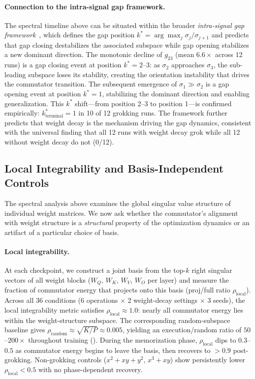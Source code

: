 \documentclass[11pt]{article}
\begin{document}
\paragraph{Connection to the intra-signal gap framework.}
The spectral timeline above can be situated within the broader \emph{intra-signal gap framework}~\citep{xu2026spectral_edge}, which defines the gap position $k^* = \arg\max_j \sigma_j/\sigma_{j+1}$ and predicts that gap closing destabilizes the associated subspace while gap opening stabilizes a new dominant direction.
The monotonic decline of $g_{23}$ (mean $6.6\times$ across 12 runs) is a gap closing event at position $k^* = 2$--$3$: as $\sigma_2$ approaches $\sigma_3$, the sub-leading subspace loses its stability, creating the orientation instability that drives the commutator transition.
The subsequent emergence of $\sigma_1 \gg \sigma_2$ is a gap opening event at position $k^* = 1$, stabilizing the dominant direction and enabling generalization.
This $k^*$ shift---from position 2--3 to position 1---is confirmed empirically: $k^*_{\mathrm{terminal}} = 1$ in 10 of 12 grokking runs.
The framework further predicts that weight decay is the mechanism driving the gap dynamics, consistent with the universal finding that all 12 runs with weight decay grok while all 12 without weight decay do not (0/12).

\subsection{Local Integrability and Basis-Independent Controls}
\label{sec:local_integrability}

The spectral analysis above examines the global singular value structure of individual weight matrices.
We now ask whether the commutator's alignment with weight structure is a \emph{structural} property of the optimization dynamics or an artifact of a particular choice of basis.

\paragraph{Local integrability.}
At each checkpoint, we construct a joint basis from the top-$k$ right singular vectors of all weight blocks ($W_Q$, $W_K$, $W_V$, $W_O$ per layer) and measure the fraction of commutator energy that projects onto this basis (proj/full ratio $\rho_{\mathrm{local}}$).
Across all 36 conditions (6 operations $\times$ 2 weight-decay settings $\times$ 3 seeds), the local integrability metric satisfies $\rho_{\mathrm{local}} \approx 1.0$: nearly all commutator energy lies within the weight-structure subspace.
The corresponding random-subspace baseline gives $\rho_{\mathrm{random}} \approx \sqrt{K/P} \approx 0.005$, yielding an execution/random ratio of $50$--$200\times$ throughout training ().
During the memorization phase, $\rho_{\mathrm{local}}$ dips to $0.3$--$0.5$ as commutator energy begins to leave the basis, then recovers to $>0.9$ post-grokking.
Non-grokking controls ($x^2+xy+y^2$, $x^3+xy$) show persistently lower $\rho_{\mathrm{local}} < 0.5$ with no phase-dependent recovery.
\end{document}
